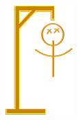 \begin{figure}[ht]
\begin{subfigure}[b]{0.1\textwidth}
        \includegraphics[width=\textwidth]{./img/gui/hang4.png}
    \end{subfigure}
    \begin{subfigure}[b]{0.1\textwidth}

\end{subfigure}
\end{figure}
